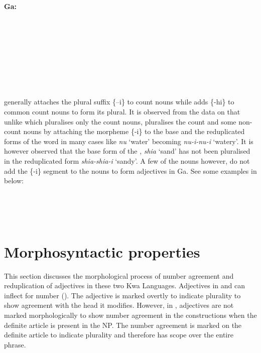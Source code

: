 \documentclass[output=paper,
modfonts
]{langscibook}
\begin{document}
\ea\label{ex:caesar:6}
\textbf{Ga:}\\
\\
\\
\\
\\
\\
\\
\\
\\ 
\z



 generally attaches the plural suffix \{–i\} to count nouns while  adds \{-hi\} to common count nouns to form its plural. It is observed from the data on  that unlike  which pluralises only the count nouns,  pluralises the count and some non-count nouns by attaching the morpheme \{-i\} to the base and the reduplicated forms of the word in many cases like \textit{nu} ‘water’ becoming \textit{nu-i-nu-i} ‘watery’. It is however observed that the base form of the , \textit{shia} ‘sand’ has not been pluralised in the reduplicated form \textit{shia-shia-i} ‘sandy’. A few of the nouns however, do not add the \{-i\} segment to the nouns to form adjectives in Ga. See some examples in  below:


\ea\label{ex:caesar:7} 
\\
\\
\\ 
\z

 
\section{Morphosyntactic properties}

This section discusses the morphological process of number agreement and reduplication of adjectives in these two Kwa Languages. Adjectives in  and  can inflect for number (\citealt{Dakubu1987,Dakubu2000,Adams1999,Adams2000}). The  adjective is marked overtly to indicate plurality to show agreement with the head  it modifies. However, in , adjectives are not marked morphologically to show number agreement in the constructions when the definite article is present in the NP. The number agreement is marked on the definite article to indicate plurality and therefore has scope over the entire  phrase. 
\end{document}
